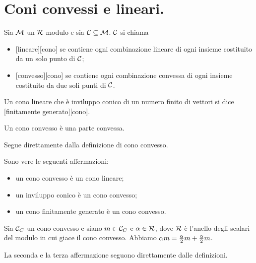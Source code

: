 \section{Coni convessi e lineari.}\label{ConiConvessiELineari}
\begin{Definition}
	Sia $\mathcal{M}$ un $\mathcal{R}$-modulo e sia $\mathcal{C} \subseteq \mathcal{M}$. $\mathcal{C}$ si chiama
	\begin{itemize}
		\item {}[lineare][cono] se contiene ogni combinazione lineare di ogni insieme costituito da un solo punto di $\mathcal{C}$; 
		\item {}[convesso][cono] se contiene ogni combinazione convessa di ogni insieme costituito da due soli punti di $\mathcal{C}$. 
	\end{itemize}
\end{Definition}
\begin{Definition}
	Un cono lineare che \`e inviluppo conico di un numero finito di vettori si dice [finitamente generato][cono].
\end{Definition}
\begin{Theorem}
	Un cono convesso \`e una parte convessa.
\end{Theorem}
\Proof Segue direttamente dalla definizione di cono convesso. \EndProof
\begin{Theorem}
	Sono vere le seguenti affermazioni:
	\begin{itemize}
		\item un cono convesso \`e un cono lineare;
		\item un inviluppo conico \`e un cono convesso;
		\item un cono finitamente generato \`e un cono convesso.
	\end{itemize}
\end{Theorem}
\Proof Sia ${\mathcal{C}_C}$ un cono convesso e siano $m \in {\mathcal{C}_C}$ e $\alpha \in \mathcal{R}$, dove $\mathcal{R}$ \`e l'anello degli scalari del modulo in cui giace il cono convesso. Abbiamo $\alpha m = \frac{\alpha}{2}m + \frac{\alpha}{2}m$.
\par La seconda e la terza affermazione seguono direttamente dalle definizioni. \EndProof
